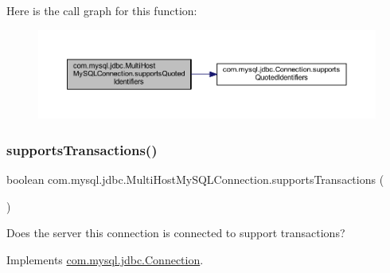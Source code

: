 Here is the call graph for this function\+:
\nopagebreak
\begin{figure}[H]
\begin{center}
\leavevmode
\includegraphics[width=350pt]{classcom_1_1mysql_1_1jdbc_1_1_multi_host_my_s_q_l_connection_af49bebe337318800930bddf6351d53f2_cgraph}
\end{center}
\end{figure}
\mbox{\label{classcom_1_1mysql_1_1jdbc_1_1_multi_host_my_s_q_l_connection_a356916a7b3d5204fdd9886f9925816e7}} 
\subsubsection{\texorpdfstring{supports\+Transactions()}{supportsTransactions()}}
{\footnotesize\ttfamily boolean com.\+mysql.\+jdbc.\+Multi\+Host\+My\+S\+Q\+L\+Connection.\+supports\+Transactions (\begin{DoxyParamCaption}{ }\end{DoxyParamCaption})}

Does the server this connection is connected to support transactions? 

Implements \mbox{\hyperlink{interfacecom_1_1mysql_1_1jdbc_1_1_connection_a730de8090ab7cf2acfbcb2fefbd84ea2}{com.\+mysql.\+jdbc.\+Connection}}.

